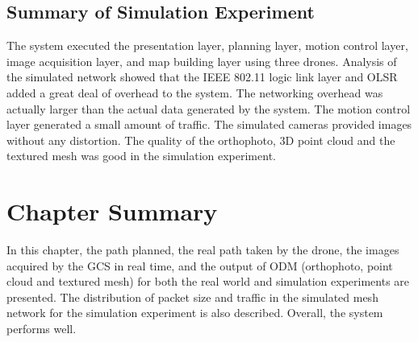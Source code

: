 \subsection{Summary of Simulation Experiment}

The system executed the presentation layer, planning layer, motion control layer, image acquisition layer, and map building layer using three drones. Analysis of the simulated network showed that the IEEE 802.11 logic link layer and OLSR added a great deal of overhead to the system. The networking overhead was actually larger than the actual data generated by the system. The motion control layer generated a small amount of traffic. The simulated cameras provided images without any distortion. The quality of the orthophoto, 3D point cloud and the textured mesh was good in the simulation experiment.

\section{Chapter Summary}
In this chapter, the path planned, the real path taken by the drone, the images acquired by the GCS in real time, and the output of ODM (orthophoto, point cloud and textured mesh) for both the real world and simulation experiments are presented. The distribution of packet size and traffic in the simulated mesh network for the simulation experiment is also described. Overall, the system performs well.


\FloatBarrier